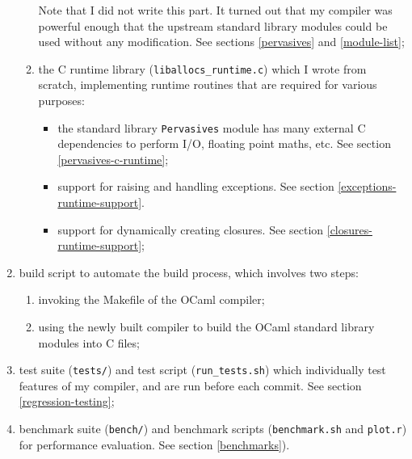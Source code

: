 \documentclass[12pt,a4paper,twoside,openright]{report}
\begin{document}
\begin{enumerate}
\begin{enumerate}
        Note that I did not write this part. It turned out that my compiler was powerful enough that the upstream
        standard library modules could be used without any modification. See
        sections \ref{pervasives} and \ref{module-list};
      \item the C runtime library (\lstinline!liballocs_runtime.c!) which I
          wrote from scratch, implementing runtime routines that are required
          for various purposes:
        \begin{itemize}
          \item the standard library \lstinline!Pervasives! module has many external C dependencies to perform I/O, floating point maths, etc. See section \ref{pervasives-c-runtime};
          \item support for raising and handling exceptions. See section \ref{exceptions-runtime-support}.
          \item support for dynamically creating closures. See section \ref{closures-runtime-support};
        \end{itemize}
    \end{enumerate}
  \item build script to automate the build process, which involves two steps:
    \begin{enumerate}
      \item invoking the Makefile of the OCaml compiler;
      \item using the newly built compiler to build the OCaml standard library modules into C files;
    \end{enumerate}
  \item test suite (\lstinline!tests/!) and test script (\lstinline!run_tests.sh!) which individually test features of my compiler, and are run before each commit. See section \ref{regression-testing};
  \item benchmark suite (\lstinline!bench/!) and benchmark scripts (\lstinline!benchmark.sh! and \lstinline!plot.r!) for performance evaluation. See section \ref{benchmarks}).
\end{enumerate}
\end{document}
